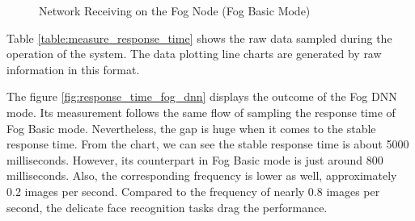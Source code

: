 \begin{figure}
\centering
{}
\caption{Network Receiving on the Fog Node  (Fog Basic Mode)}
\label{fig:network_receiving_fog_basic}
\end{figure}

Table \ref{table:measure_response_time} shows the raw data sampled during the operation of the system. The data plotting line charts are generated by raw information in this format.

The figure \ref{fig:response_time_fog_dnn} displays the outcome of the Fog DNN mode. Its measurement follows the same flow of sampling the response time of Fog Basic mode. Nevertheless, the gap is huge when it comes to the stable response time. From the chart, we can see the stable response time is about 5000 milliseconds. However, its counterpart in Fog Basic mode is just around 800 milliseconds. Also, the corresponding frequency is lower as well, approximately 0.2 images per second. Compared to the frequency of nearly 0.8 images per second, the delicate face recognition tasks drag the performance.

